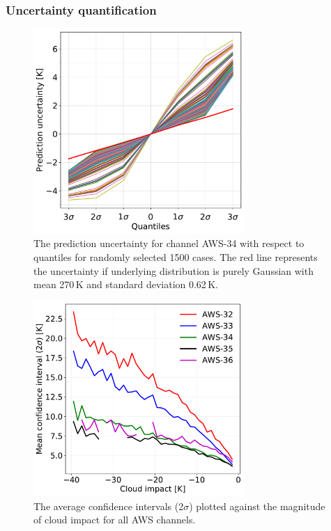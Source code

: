 \documentclass[amt, manuscript]{copernicus}
\begin{document}
\subsubsection{Uncertainty quantification}
\begin{figure}[t]
	\includegraphics[width = 80mm]{Figures/prediction_uncertainty_aws-34.pdf}	
	\caption{The prediction uncertainty  for channel AWS-34  with respect to quantiles for randomly selected 1500 cases. The red line represents the uncertainty if underlying distribution is purely Gaussian with mean 270\,K and standard deviation 0.62\,K.}
	\label{fig:prediction_uncertainty_aws-34}	
\end{figure}
\begin{figure}[t]
	\includegraphics[width = 80mm]{Figures/cloud_impact_uncertainty_AWS.pdf}	
	\caption{The average confidence intervals (2$\sigma$) plotted against the magnitude of cloud impact for all AWS channels.}
	\label{fig:uncertainty_cloud_impact}	
\end{figure}
\end{document}
